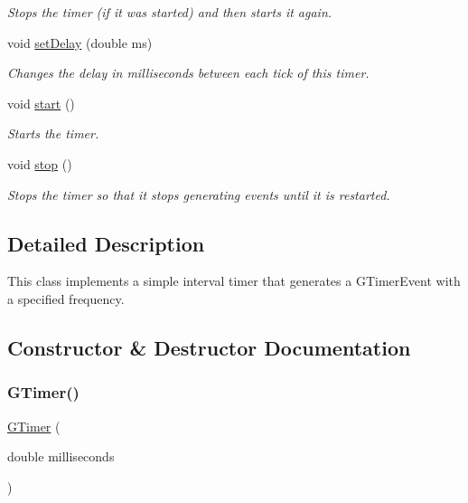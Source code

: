 \begin{DoxyCompactItemize}
\begin{DoxyCompactList}\small\item\em Stops the timer (if it was started) and then starts it again. \end{DoxyCompactList}\item 
void \mbox{\hyperlink{classsgl_1_1GTimer_acebfcbc48c6acd460dac117a8f71a92f}{set\+Delay}} (double ms)
\begin{DoxyCompactList}\small\item\em Changes the delay in milliseconds between each tick of this timer. \end{DoxyCompactList}\item 
void \mbox{\hyperlink{classsgl_1_1GTimer_a60de64d75454385b23995437f1d72669}{start}} ()
\begin{DoxyCompactList}\small\item\em Starts the timer. \end{DoxyCompactList}\item 
void \mbox{\hyperlink{classsgl_1_1GTimer_a8c528baf37154d347366083f0f816846}{stop}} ()
\begin{DoxyCompactList}\small\item\em Stops the timer so that it stops generating events until it is restarted. \end{DoxyCompactList}\end{DoxyCompactItemize}


\subsection{Detailed Description}
This class implements a simple interval timer that generates a {\ttfamily G\+Timer\+Event} with a specified frequency. 

\subsection{Constructor \& Destructor Documentation}
\mbox{\label{classsgl_1_1GTimer_ab947e096ce76b63f283502e4b4446810}} 
\subsubsection{\texorpdfstring{G\+Timer()}{GTimer()}}
{\footnotesize\ttfamily \mbox{\hyperlink{classsgl_1_1GTimer}{G\+Timer}} (\begin{DoxyParamCaption}\item[{double}]{milliseconds }\end{DoxyParamCaption})}



